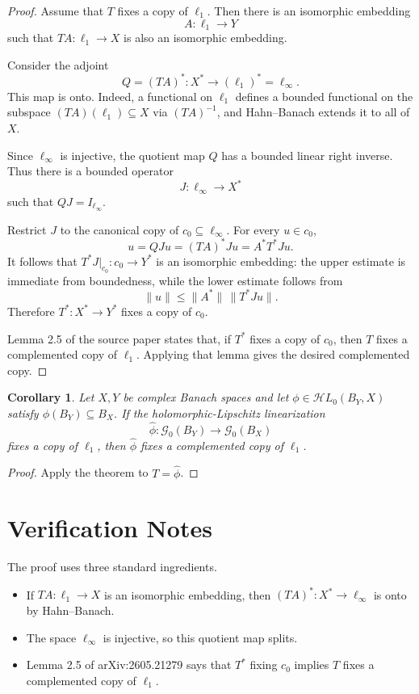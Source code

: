 \documentclass[11pt]{article}
\newtheorem{corollary}{Corollary}
\newcommand{\ellone}{\ell_1}
\newcommand{\ellinf}{\ell_\infty}
\newcommand{\HL}{\mathcal{H}L}
\newcommand{\G}{\mathcal{G}}
\begin{document}
\begin{proof}
Assume that \(T\) fixes a copy of \(\ellone\). Then there is an isomorphic
embedding
\[
  A:\ellone\longrightarrow Y
\]
such that \(TA:\ellone\to X\) is also an isomorphic embedding.

Consider the adjoint
\[
  Q=(TA)^*:X^*\longrightarrow (\ellone)^*=\ellinf.
\]
This map is onto. Indeed, a functional on \(\ellone\) defines a bounded
functional on the subspace \((TA)(\ellone)\subseteq X\) via
\((TA)^{-1}\), and Hahn--Banach extends it to all of \(X\).

Since \(\ellinf\) is injective, the quotient map \(Q\) has a bounded linear
right inverse. Thus there is a bounded operator
\[
  J:\ellinf\longrightarrow X^*
\]
such that \(QJ=I_{\ellinf}\).

Restrict \(J\) to the canonical copy of \(c_0\subseteq\ellinf\). For every
 \(u\in c_0\),
\[
  u=QJu=(TA)^*Ju=A^*T^*Ju.
\]
It follows that \(T^*J|_{c_0}:c_0\to Y^*\) is an isomorphic embedding: the
upper estimate is immediate from boundedness, while the lower estimate follows
from
\[
  \|u\| \leq \|A^*\|\,\|T^*Ju\|.
\]
Therefore \(T^*:X^*\to Y^*\) fixes a copy of \(c_0\).

Lemma 2.5 of the source paper states that, if \(T^*\) fixes a copy of \(c_0\),
then \(T\) fixes a complemented copy of \(\ellone\). Applying that lemma gives
the desired complemented copy.
\end{proof}

\begin{corollary}
Let \(X,Y\) be complex Banach spaces and let
\(\phi\in \HL_0(B_Y,X)\) satisfy \(\phi(B_Y)\subseteq B_X\). If the
holomorphic-Lipschitz linearization
\[
  \widehat{\phi}:\G_0(B_Y)\to \G_0(B_X)
\]
fixes a copy of \(\ellone\), then \(\widehat{\phi}\) fixes a complemented copy
of \(\ellone\).
\end{corollary}

\begin{proof}
Apply the theorem to \(T=\widehat{\phi}\).
\end{proof}

\section*{Verification Notes}

The proof uses three standard ingredients.

\begin{itemize}
\item If \(TA:\ellone\to X\) is an isomorphic embedding, then
  \((TA)^*:X^*\to\ellinf\) is onto by Hahn--Banach.
\item The space \(\ellinf\) is injective, so this quotient map splits.
\item Lemma 2.5 of arXiv:2605.21279 says that \(T^*\) fixing \(c_0\) implies
  \(T\) fixes a complemented copy of \(\ellone\).
\end{itemize}
\end{document}
